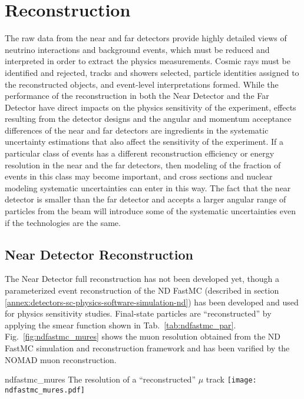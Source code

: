 \chapter{Reconstruction}
\label{annex:detectors-sc-physics-software-reconstruction}

The raw data from the near and far detectors provide highly detailed views of neutrino
interactions and background events, which must be reduced and interpreted in order to
extract the physics measurements.  Cosmic rays must be identified and rejected, tracks and
showers selected, particle identities assigned to the reconstructed objects, and event-level
interpretations formed.  While the performance of the reconstruction in both the Near Detector
and the Far Detector have direct impacts on the physics sensitivity of the experiment, effects
resulting from the detector designs and the angular and momentum acceptance differences of the
near and far detectors are ingredients in the systematic uncertainty estimations that also
affect the sensitivity of the experiment.  If a particular class of events has a different
reconstruction efficiency or energy resolution in the near and the far detectors, then modeling of the fraction of events
in this class may become important, and cross sections and nuclear modeling systematic uncertainties
can enter in this way.  The fact that the near detector is smaller than the far detector and accepts a larger
angular range of particles from the beam will introduce some of the systematic uncertainties even if the
technologies are the same. 

\section{Near Detector Reconstruction}
\label{annex:detectors-sc-physics-software-reconstruction-nd}

The Near Detector full reconstruction has not been developed yet, though a parameterized event
reconstruction of the ND FastMC (described in section \ref{annex:detectors-sc-physics-software-simulation-nd})
has been developed and used for physics sensitivity studies. Final-state particles are ``reconstructed''
by applying the smear function shown in Tab.~\ref{tab:ndfastmc_par}. Fig.~\ref{fig:ndfastmc_mures} shows
the muon resolution obtained from the ND FastMC simulation and reconstruction framework and has been
varified by the NOMAD muon reconstruction.
\begin{cdrfigure}{ndfastmc_mures}
{The resolution of a ``reconstructed'' $\mu$ track}
\texttt{[image: ndfastmc\_mures.pdf]}
\end{cdrfigure}

